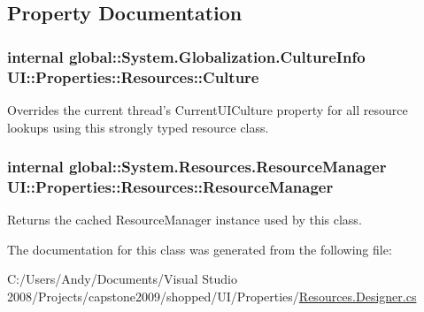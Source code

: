 \subsection{Property Documentation}
\hypertarget{class_u_i_1_1_properties_1_1_resources_a46a0e9bbbbdb0717d4a25428483b2728}{
\subsubsection[{Culture}]{\setlength{\rightskip}{0pt plus 5cm}internal global::System.Globalization.CultureInfo UI::Properties::Resources::Culture}}
\label{class_u_i_1_1_properties_1_1_resources_a46a0e9bbbbdb0717d4a25428483b2728}


Overrides the current thread's CurrentUICulture property for all resource lookups using this strongly typed resource class. \hypertarget{class_u_i_1_1_properties_1_1_resources_a8766fbe41ebf10ebf9984cbe9e4ad7f9}{
\subsubsection[{ResourceManager}]{\setlength{\rightskip}{0pt plus 5cm}internal global::System.Resources.ResourceManager UI::Properties::Resources::ResourceManager}}
\label{class_u_i_1_1_properties_1_1_resources_a8766fbe41ebf10ebf9984cbe9e4ad7f9}


Returns the cached ResourceManager instance used by this class. 

The documentation for this class was generated from the following file:\begin{DoxyCompactItemize}
\item 
C:/Users/Andy/Documents/Visual Studio 2008/Projects/capstone2009/shopped/UI/Properties/\hyperlink{_resources_8_designer_8cs}{Resources.Designer.cs}\end{DoxyCompactItemize}
